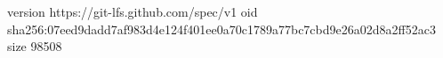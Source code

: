 version https://git-lfs.github.com/spec/v1
oid sha256:07eed9dadd7af983d4e124f401ee0a70c1789a77bc7cbd9e26a02d8a2ff52ac3
size 98508
